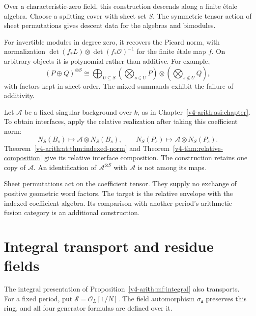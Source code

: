 Over a characteristic-zero field, this construction descends along a finite \'etale algebra.
Choose a splitting cover with sheet set $S$. The symmetric tensor action of sheet permutations
gives descent data for the algebras and bimodules.

For invertible modules in degree zero, it recovers the Picard
norm, with normalization
$\det(f_*L)\otimes\det(f_*\mathcal O)^{-1}$ for the finite \'etale map $f$. On
arbitrary objects it is polynomial rather than additive. For example,
\[
 (P\oplus Q)^{\otimes S}
 \cong\bigoplus_{U\subseteq S}
 \left(\bigotimes_{s\in U}P\right)\otimes
 \left(\bigotimes_{s\notin U}Q\right),
\]
with factors kept in sheet order. The mixed summands exhibit
the failure of additivity.

Let \(\mathscr A\) be a fixed singular background over \(k\),
as in Chapter~\ref{v4-arith:asi:chapter}.
To obtain interfaces, apply the relative realization after taking this
coefficient norm:
\[
 N_S(B_s)\longmapsto\mathscr A\otimes N_S(B_s),\qquad
 N_S(P_s)\longmapsto\mathscr A\otimes N_S(P_s).
\]
Theorem~\ref{v4-arith:at:thm:indexed-norm} and Theorem~\ref{v4-thm:relative-composition} give its relative
interface composition. The construction retains one copy of
\(\mathscr A\). An identification of \(\mathscr A^{\otimes S}\)
with \(\mathscr A\) is not among its maps.

Sheet permutations act on the coefficient tensor.
They supply no exchange of positive geometric word factors.
The target is the relative envelope with the indexed coefficient
algebra. Its comparison with another period's arithmetic fusion
category is an additional construction.


\section{Integral transport and residue fields}
\label{v4-arith:at:integral}

The integral presentation of
Proposition~\ref{v4-arith:mf:integral} also transports.
For a fixed period, put \(\mathcal S=\mathcal O_L[1/N]\).
The field automorphism \(\sigma_{\mathfrak a}\) preserves this
ring, and all four generator formulas are defined over it.

